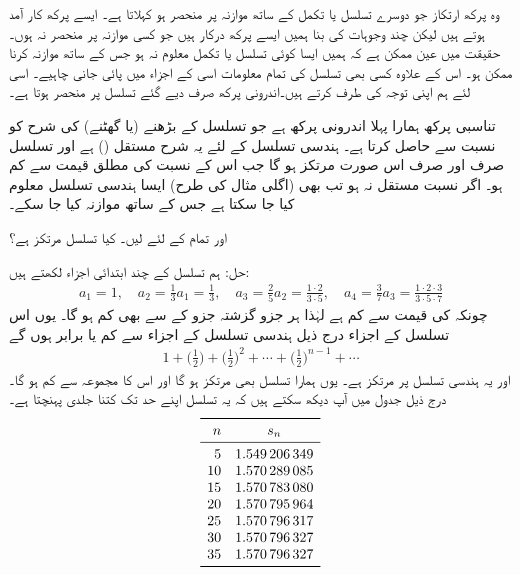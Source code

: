 وہ پرکھ ارتکاز  جو دوسرے تسلسل یا تکمل کے ساتھ موازنہ پر منحصر ہو  کہلاتا ہے۔ ایسے پرکھ کار آمد ہوتے ہیں لیکن چند وجوہات کی بنا ہمیں ایسے پرکھ درکار ہیں جو کسی موازنہ پر منحصر نہ ہوں۔ حقیقت میں عین ممکن ہے کہ ہمیں ایسا کوئی تسلسل یا تکمل معلوم نہ ہو جس کے ساتھ موازنہ کرنا ممکن ہو۔ اس کے علاوہ کسی بھی تسلسل کی تمام معلومات اسی کے اجزاء میں پائی جانی چاہیے۔ اسی لئے ہم اپنی توجہ  کی طرف  کرتے ہیں۔اندرونی پرکھ صرف دیے گئے تسلسل پر منحصر ہوتا ہے۔

تناسبی پرکھ ہمارا پہلا اندرونی پرکھ ہے جو تسلسل کے بڑھنے (یا گھٹنے) کی شرح کو نسبت  سے حاصل کرتا ہے۔ ہندسی تسلسل  کے لئے یہ شرح مستقل () ہے اور تسلسل صرف اور صرف اس صورت مرتکز ہو گا جب اس کے نسبت کی مطلق قیمت  سے کم ہو۔ اگر نسبت مستقل نہ ہو تب بھی (اگلی مثال کی طرح) ایسا ہندسی تسلسل معلوم کیا جا سکتا ہے جس کے ساتھ موازنہ کیا جا سکے۔

 اور تمام  کے لئے  لیں۔ کیا تسلسل  مرتکز ہے؟

حل:\quad
ہم تسلسل کے چند ابتدائی اجزاء لکھتے ہیں:
\begin{align*}
a_1=1,\quad a_2=\frac{1}{3}a_1=\frac{1}{3},\quad a_3=\frac{2}{5}a_2=\frac{1\cdot 2}{3\cdot 5},\quad a_4=\frac{3}{7}a_3=\frac{1\cdot 2\cdot 3}{3\cdot 5\cdot 7}
\end{align*}
چونکہ  کی قیمت  سے کم ہے لہٰذا ہر جزو گزشتہ جزو کے  سے بھی کم ہو گا۔ یوں اس  تسلسل کے اجزاء درج ذیل ہندسی تسلسل کے اجزاء سے کم یا برابر ہوں گے
\begin{align*}
1+\big(\frac{1}{2}\big)+\big(\frac{1}{2}\big)^2+\cdots+\big(\frac{1}{2}\big)^{n-1}+\cdots
\end{align*}
 اور یہ ہندسی تسلسل  پر مرتکز ہے۔ یوں ہمارا تسلسل بھی مرتکز ہو گا اور اس کا مجموعہ  سے کم ہو گا۔درج ذیل جدول میں آپ دیکھ سکتے ہیں کہ یہ تسلسل اپنے حد  تک کتنا جلدی پہنچتا ہے۔
\begin{align*}
\begin{array}{rc}
\toprule
n&s_n\\
\midrule
5&\num{1.549206349}\\
10&\num{1.570289085}\\
15&\num{1.570783080}\\
20&\num{1.570795964}\\
25&\num{1.570796317}\\
30&\num{1.570796327}\\
35&\num{1.570796327}\\
\bottomrule
\end{array}
\end{align*}

